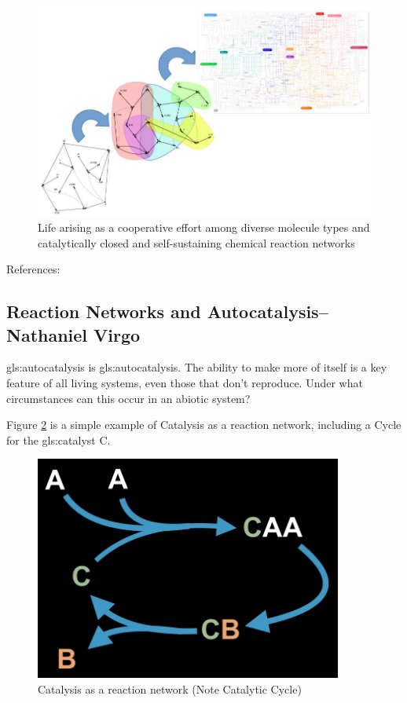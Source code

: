 \documentclass[]{article}
\begin{document}
\begin{figure}[H]
	\caption[Life arising as a cooperative effort
	among diverse molecule types]{Life arising as a cooperative effort
		among diverse molecule types
		and catalytically closed
		and self-sustaining
		chemical reaction networks}\label{fig:CooperativeOrigin}
	\includegraphics[width=\textwidth]{CooperativeOrigin}
\end{figure}

References: \cite{wim2017origin,wim2019wandering,hordijk2012structure,sousa2015autocatalytic}

\subsection[Reaction Networks and Autocatalysis]{Reaction Networks and Autocatalysis--Nathaniel Virgo}


\Gls{gls:autocatalysis} is \glsdesc{gls:autocatalysis}. The ability to make more of itself is a key feature of all living systems, even those that don't reproduce. Under what circumstances can this occur in an abiotic system? 

Figure \ref{fig:CatalysisReactionNetwork} is a simple example of Catalysis as a reaction network, including a Cycle for the \gls{gls:catalyst} C.

\begin{figure}[H]
	\caption{Catalysis as a reaction network (Note Catalytic Cycle)}\label{fig:CatalysisReactionNetwork}
	\includegraphics[width=0.9\textwidth]{CatalysisReactionNetwork}
\end{figure}
\end{document}
